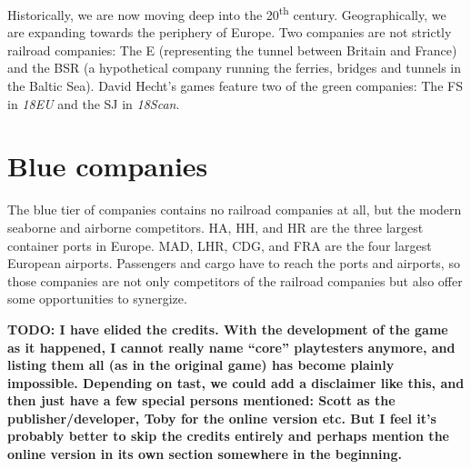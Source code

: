 \documentclass[10pt,final]{report}
\begin{document}
Historically, we are now moving deep into the 20\textsuperscript{th}
century. Geographically, we are expanding towards the periphery of
Europe. Two companies are not strictly railroad companies: The E
(representing the tunnel between Britain and France) and the BSR (a
hypothetical company running the ferries, bridges and tunnels in the
Baltic Sea). David Hecht's games feature two of the green companies:
The FS in \emph{18EU} and the SJ in \emph{18Scan}.

\section{Blue companies}

The blue tier of companies contains no railroad companies at all, but
the modern seaborne and airborne competitors. HA, HH, and HR are the
three largest container ports in Europe. MAD, LHR, CDG, and FRA are
the four largest European airports. Passengers and cargo have to reach
the ports and airports, so those companies are not only competitors of
the railroad companies but also offer some opportunities to
synergize.

\textbf{TODO: I have elided the credits. With the development of the
  game as it happened, I cannot really name ``core'' playtesters
  anymore, and listing them all (as in the original game) has become
  plainly impossible. Depending on tast, we could add a disclaimer
  like this, and then just have a few special persons mentioned: Scott
  as the publisher/developer, Toby for the online version etc. But I feel
  it's probably better to skip the credits entirely and perhaps
  mention the online version in its own section somewhere in the beginning.}
\end{document}
